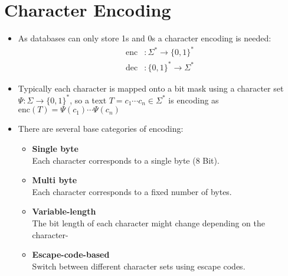 \documentclass[a4paper, 11pt, accentcolor = tud3b]{tudreport}
\begin{document}
        \section{Character Encoding} %
            \begin{itemize}
            	\item As databases can only store 1s and 0s a character encoding is needed:
            		\begin{align*}
            			\text{enc} & : \Sigma^* \rightarrow \{ 0, 1 \}^* \tag{Encoding} \\
            			\text{dec} & : \{ 0, 1 \}^* \rightarrow \Sigma^* \tag{Decoding}
            		\end{align*}
            	\item Typically each character is mapped onto a bit mask using a character set \( \Psi : \Sigma \rightarrow \{ 0, 1 \}^* \), so a text \( T = c_1 \cdots c_n \in \Sigma^* \) is encoding as \( \text{enc}(T) = \Psi(c_1)\cdots\Psi(c_n) \)
            	\item There are several base categories of encoding:
            		\begin{itemize}
            			\item \textbf{Single byte} \\ Each character corresponds to a single byte (8 Bit).
            			\item \textbf{Multi byte} \\ Each character corresponds to a fixed number of bytes.
            			\item \textbf{Variable-length} \\ The bit length of each character might change depending on the character-
            			\item \textbf{Escape-code-based} \\ Switch between different character sets using escape codes.
            		\end{itemize}
            \end{itemize}
\end{document}
